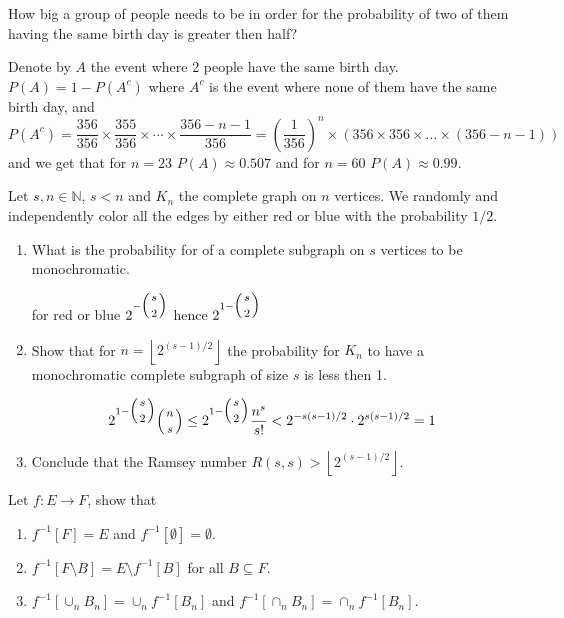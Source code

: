 \documentclass[a4paper,11pt]{exam}
\renewcommand{\binom}{\mbinom}
\newcommand{\N}{\mathbb{N}}
\begin{document}
\begin{questions}
\question How big a group of people needs to be in order for the probability of two of them having the same birth day is greater then half?

\begin{solution}
	Denote by $A$ the event where 2 people have the same birth day. $P(A) = 1- P(A^c)$ where $A^c$ is the event where none of them have the same birth day, and
	\[
	P(A^c)=\frac{356}{356}\times\frac{355}{356}\times\cdots\times\frac{356-n-1}{356} =\left( \frac{1}{356}\right)^n\times \left(356\times356\times\dots\times(356-n-1)  \right) 
	\]
	and we get that for $ n=23 $ $P(A) \approx 0.507$  and for $ n=60 $ $P(A) \approx 0.99$. 
\end{solution}



Let  $s,n\in\N$, $s<n$ and $K_n$ the complete graph on $n$ vertices. We randomly and independently color all the edges by either red or blue with the probability $1/2$.
\begin{enumerate}
	\item What is the probability for of a complete subgraph on $s$ vertices to be monochromatic.
	\begin{solution}
		for red or blue $ 2^{-\binom{s}{2}}$  hence $ 2^{1-\binom{s}{2}}$
	\end{solution}
	\item Show that for $n=\left\lfloor 2^{(s-1)/2} \right\rfloor $ the probability for $K_n$ to have a monochromatic complete subgraph of size $s$ is less then 1.
	\begin{solution}
		\[  
			2^{1-\binom{s}{2}}\binom{n}{s}\leq 2^{1-\binom{s}{2}}\frac{n^s}{s!}< 2^{-s(s-1)/2}\cdot2^{s(s-1)/2} = 1
		\]
	\end{solution}
	\item Conclude that the Ramsey number $R(s,s)>\left\lfloor 2^{(s-1)/2} \right\rfloor$.
\end{enumerate}




\question
Let $f:E \to F$, show that
\begin{enumerate}
	\item $f^{-1}[F] = E$ and $f^{-1}[\emptyset] = \emptyset$.
	
	\item $f^{-1}[F\setminus B] = E \setminus f^{-1}[B]$ for all $B \subseteq F$.
	
	\item $f^{-1}[\cup_{n}B_n] = \cup_{n} f^{-1}[B_n]$ and $f^{-1}[\cap_{n}B_n] = \cap_{n} f^{-1}[B_n]$.
\end{enumerate}


\end{questions}
\end{document}
